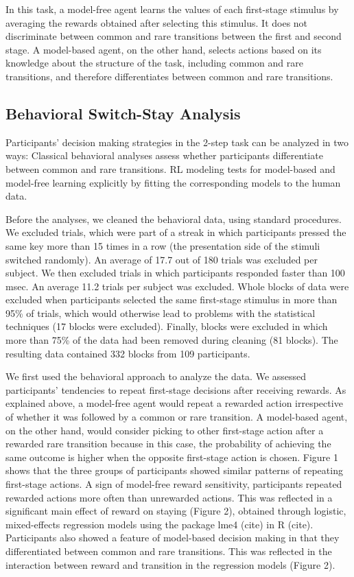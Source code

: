 \documentclass[11pt]{article} %
\begin{document}
In this task, a model-free agent learns the values of each first-stage stimulus by averaging the rewards obtained after selecting this stimulus. It does not discriminate between common and rare transitions between the first and second stage. A model-based agent, on the other hand, selects actions based on its knowledge about the structure of the task, including common and rare transitions, and therefore differentiates between common and rare transitions.

\subsection{Behavioral Switch-Stay Analysis}
Participants' decision making strategies in the 2-step task can be analyzed in two ways: Classical behavioral analyses assess whether participants differentiate between common and rare transitions. RL modeling tests for model-based and model-free learning explicitly by fitting the corresponding models to the human data.

Before the analyses, we cleaned the behavioral data, using standard procedures. We excluded trials, which were part of a streak in which participants pressed the same key more than 15 times in a row (the presentation side of the stimuli switched randomly). An average of 17.7 out of 180 trials was excluded per subject. We then excluded trials in which participants responded faster than 100 msec. An average 11.2 trials per subject was excluded. Whole blocks of data were excluded when participants selected the same first-stage stimulus in more than 95\% of trials, which would otherwise lead to problems with the statistical techniques (17 blocks were excluded). Finally, blocks were excluded in which more than 75\% of the data had been removed during cleaning (81 blocks). The resulting data contained 332 blocks from 109 participants.

We first used the behavioral approach to analyze the data. We assessed participants' tendencies to repeat first-stage decisions after receiving rewards. As explained above, a model-free agent would repeat a rewarded action irrespective of whether it was followed by a common or rare transition. A model-based agent, on the other hand, would consider picking to other first-stage action after a rewarded rare transition because in this case, the probability of achieving the same outcome is higher when the opposite first-stage action is chosen. Figure 1 shows that the three groups of participants showed similar patterns of repeating first-stage actions. A sign of model-free reward sensitivity, participants repeated rewarded actions more often than unrewarded actions. This was reflected in a significant main effect of reward on staying (Figure 2), obtained through logistic, mixed-effects regression models using the package lme4 (cite) in R (cite). Participants also showed a feature of model-based decision making in that they differentiated between common and rare transitions. This was reflected in the interaction between reward and transition in the regression models (Figure 2).
\end{document}
